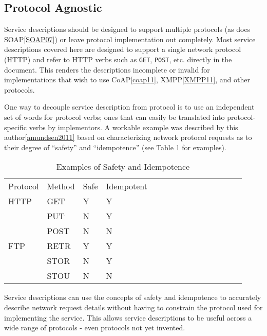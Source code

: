 \documentclass{wsrest2014}
\begin{document}
\subsection{Protocol Agnostic}
\label{_protocol_agnostic}
 \par{}Service descriptions should be designed to support multiple protocols (as does SOAP\hyperlink{SOAP07}{[SOAP07]}) or leave protocol implementation out completely. Most service descriptions covered here are designed to support a single network protocol (HTTP) and refer to HTTP verbs such as \texttt{GET},  \texttt{POST}, etc. directly in the document. This renders the descriptions incomplete or invalid for implementations that wish to use CoAP\hyperlink{coap11}{[coap11]}, XMPP\hyperlink{XMPP11}{[XMPP11]}, and other protocols.
 \par{}One way to decouple service description from protocol is to use an independent set of words for protocol verbs; ones that can easily be translated into protocol-specific verbs by implementors. A workable example was described by this author\hyperlink{amundsen2011}{[amundsen2011]} based on characterizing network protocol requests as to their degree of ``safety'' and ``idempotence'' (see Table 1 for examples).
  \begin{table}
  \begin{center}
 \caption{Examples of Safety and Idempotence}
 \begin{tabular}{lllllllllllllll
 }
 
 Protocol  &
 Method  &
 Safe  &
 Idempotent %
 \tabularnewline

 HTTP      &
 GET     &
 Y     &
 Y %
 \tabularnewline

           &
 PUT     &
 N     &
 Y %
 \tabularnewline

           &
 POST    &
 N     &
 N %
 \tabularnewline

 FTP       &
 RETR    &
 Y     &
 Y %
 \tabularnewline

           &
 STOR    &
 N     &
 Y %
 \tabularnewline

           &
 STOU    &
 N     &
 N %
 \tabularnewline
 \end{tabular}
  \end{center}
  \end{table}
 \par{}Service descriptions can use the concepts of safety and idempotence to accurately describe network request details without having to constrain the protocol used for implementing the service. This allows service descriptions to be useful across a wide range of protocols - even protocols not yet invented.
\hypertarget{_media_type_independence}{}
\end{document}
